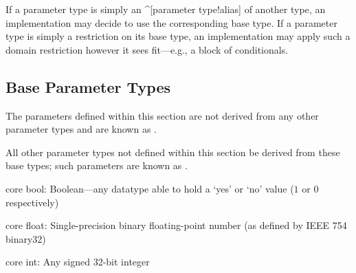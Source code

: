 \begin{ex}
  If a parameter type is simply an ^[parameter type!alias] of another type, an
  implementation may decide to use the corresponding base type. If a parameter
  type is simply a restriction on its base type, an implementation may apply
  such a domain restriction however it sees fit---e.g., a block of conditionals.
\end{ex}

\subsection{Base Parameter Types}
The parameters defined within this section are not derived from any other
parameter types and are known as .

All other parameter types not defined within this section \shall be derived from
these base types; such parameters are known as .

\begin{description}
  \typedef core bool:
  Boolean---any datatype able to hold a `yes' or `no' value ($1$ or $0$
  respectively)

  \typedef core float:
  Single-precision binary floating-point number (as defined by IEEE 754
  binary32)

  \typedef core int:
  Any signed 32-bit integer

\end{description}



